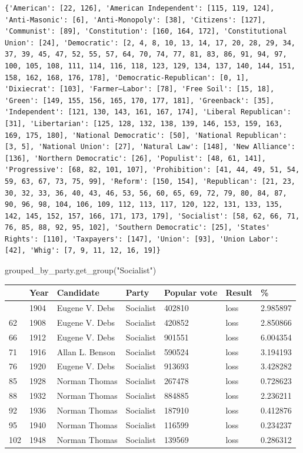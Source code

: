 \documentclass[
  letterpaper,
  DIV=11,
  numbers=noendperiod]{scrreprt}
\newenvironment{Shaded}{\begin{snugshade}}{\end{snugshade}}
\newcommand{\NormalTok}[1]{\textcolor[rgb]{0.00,0.23,0.31}{#1}}
\newcommand{\StringTok}[1]{\textcolor[rgb]{0.13,0.47,0.30}{#1}}
\begin{document}
\begin{verbatim}
{'American': [22, 126], 'American Independent': [115, 119, 124], 'Anti-Masonic': [6], 'Anti-Monopoly': [38], 'Citizens': [127], 'Communist': [89], 'Constitution': [160, 164, 172], 'Constitutional Union': [24], 'Democratic': [2, 4, 8, 10, 13, 14, 17, 20, 28, 29, 34, 37, 39, 45, 47, 52, 55, 57, 64, 70, 74, 77, 81, 83, 86, 91, 94, 97, 100, 105, 108, 111, 114, 116, 118, 123, 129, 134, 137, 140, 144, 151, 158, 162, 168, 176, 178], 'Democratic-Republican': [0, 1], 'Dixiecrat': [103], 'Farmer–Labor': [78], 'Free Soil': [15, 18], 'Green': [149, 155, 156, 165, 170, 177, 181], 'Greenback': [35], 'Independent': [121, 130, 143, 161, 167, 174], 'Liberal Republican': [31], 'Libertarian': [125, 128, 132, 138, 139, 146, 153, 159, 163, 169, 175, 180], 'National Democratic': [50], 'National Republican': [3, 5], 'National Union': [27], 'Natural Law': [148], 'New Alliance': [136], 'Northern Democratic': [26], 'Populist': [48, 61, 141], 'Progressive': [68, 82, 101, 107], 'Prohibition': [41, 44, 49, 51, 54, 59, 63, 67, 73, 75, 99], 'Reform': [150, 154], 'Republican': [21, 23, 30, 32, 33, 36, 40, 43, 46, 53, 56, 60, 65, 69, 72, 79, 80, 84, 87, 90, 96, 98, 104, 106, 109, 112, 113, 117, 120, 122, 131, 133, 135, 142, 145, 152, 157, 166, 171, 173, 179], 'Socialist': [58, 62, 66, 71, 76, 85, 88, 92, 95, 102], 'Southern Democratic': [25], 'States' Rights': [110], 'Taxpayers': [147], 'Union': [93], 'Union Labor': [42], 'Whig': [7, 9, 11, 12, 16, 19]}
\end{verbatim}

\begin{Shaded}
\begin{Highlighting}[]
\NormalTok{grouped\_by\_party.get\_group(}\StringTok{"Socialist"}\NormalTok{)}
\end{Highlighting}
\end{Shaded}

\begin{longtable}[]{@{}lllllll@{}}
\toprule\noalign{}
& Year & Candidate & Party & Popular vote & Result & \% \\
\midrule\noalign{}
\endhead
\bottomrule\noalign{}
\endlastfoot
58 & 1904 & Eugene V. Debs & Socialist & 402810 & loss & 2.985897 \\
62 & 1908 & Eugene V. Debs & Socialist & 420852 & loss & 2.850866 \\
66 & 1912 & Eugene V. Debs & Socialist & 901551 & loss & 6.004354 \\
71 & 1916 & Allan L. Benson & Socialist & 590524 & loss & 3.194193 \\
76 & 1920 & Eugene V. Debs & Socialist & 913693 & loss & 3.428282 \\
85 & 1928 & Norman Thomas & Socialist & 267478 & loss & 0.728623 \\
88 & 1932 & Norman Thomas & Socialist & 884885 & loss & 2.236211 \\
92 & 1936 & Norman Thomas & Socialist & 187910 & loss & 0.412876 \\
95 & 1940 & Norman Thomas & Socialist & 116599 & loss & 0.234237 \\
102 & 1948 & Norman Thomas & Socialist & 139569 & loss & 0.286312 \\
\end{longtable}
\end{document}
